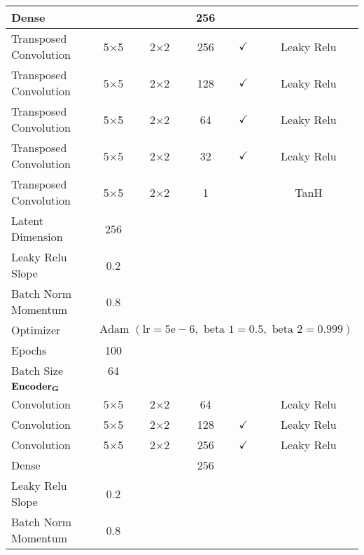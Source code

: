 \begin{longtable}[c]{@{}lccccc@{}}
	Dense & \multicolumn{1}{c}{} &  & 256 &  &  \\ \hline
	Transposed Convolution & \multicolumn{1}{c}{5$\times$5} & 2$\times$2 & 256 & $\checkmark$ & Leaky Relu \\
	Transposed Convolution & \multicolumn{1}{c}{5$\times$5} & 2$\times$2 & 128 & $\checkmark$ & Leaky Relu \\
	Transposed Convolution & \multicolumn{1}{c}{5$\times$5} & 2$\times$2 & 64 & $\checkmark$ & Leaky Relu \\
	Transposed Convolution & \multicolumn{1}{c}{5$\times$5} & 2$\times$2 & 32 & $\checkmark$ & Leaky Relu \\
	Transposed Convolution & \multicolumn{1}{c}{5$\times$5} & 2$\times$2 & 1 &  & TanH\\ \hline
	Latent Dimension & 256 & \multicolumn{1}{l}{} & \multicolumn{1}{l}{} & \multicolumn{1}{l}{} & \multicolumn{1}{l}{} \\
	Leaky Relu Slope & 0.2 & \multicolumn{1}{l}{} & \multicolumn{1}{l}{} & \multicolumn{1}{l}{} & \multicolumn{1}{l}{} \\
	Batch Norm Momentum & 0.8 & \multicolumn{1}{l}{} & \multicolumn{1}{l}{} & \multicolumn{1}{l}{} & \multicolumn{1}{l}{} \\
	Optimizer & \multicolumn{5}{l}{$\text { Adam }(\mathrm{lr}=5 \mathrm{e}-6, \text { beta } 1=0.5, \text { beta } 2=0.999)$} \\ \hline
	Epochs & 100 & \multicolumn{1}{l}{} & \multicolumn{1}{l}{} & \multicolumn{1}{l}{} & \multicolumn{1}{l}{} \\
	Batch Size & 64 & \multicolumn{1}{l}{} & \multicolumn{1}{l}{} & \multicolumn{1}{l}{} & \multicolumn{1}{l}{} \\ \hline
	\multicolumn{6}{l}{$\bold{Encoder_{G}}$} \\
	Convolution & \multicolumn{1}{c}{5$\times$5} & 2$\times$2 & 64 &  & Leaky Relu \\
	Convolution & \multicolumn{1}{c}{5$\times$5} & 2$\times$2 & 128 & $\checkmark$ & Leaky Relu \\
	Convolution & \multicolumn{1}{c}{5$\times$5} & 2$\times$2 & 256 & $\checkmark$ & Leaky Relu \\
	Dense & \multicolumn{1}{c}{} &  & 256 &  &  \\ \hline
	Leaky Relu Slope & 0.2 & \multicolumn{1}{l}{} & \multicolumn{1}{l}{} & \multicolumn{1}{l}{} & \multicolumn{1}{l}{} \\
	Batch Norm Momentum & 0.8 & \multicolumn{1}{l}{} & \multicolumn{1}{l}{} & \multicolumn{1}{l}{} & \multicolumn{1}{l}{} \\

\end{longtable}
